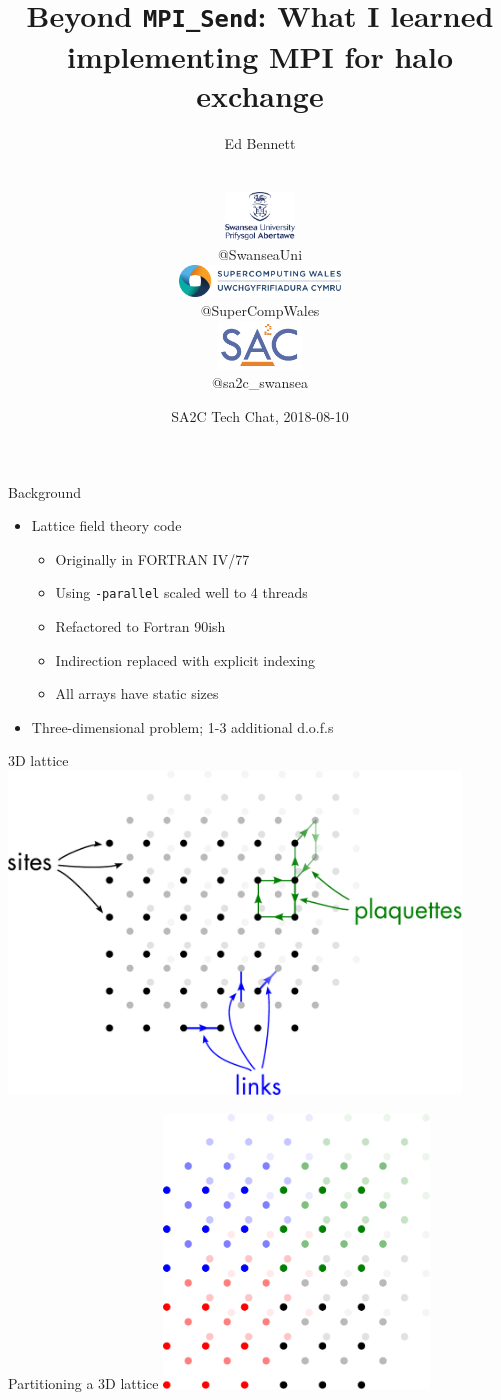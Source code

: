 \documentclass[handout]{beamer}
\title{Beyond \texttt{MPI\_Send}: What I learned implementing MPI for halo exchange}
\author{{\large Ed Bennett}
	\\{\small@QuantumofEd}
	\\\vspace{16pt}
	\hfill
	\parbox{0.22\textwidth}{\centering\includegraphics[height=36pt]{logos/swansea}\\\small @SwanseaUni}
	\parbox{0.44\textwidth}{\centering\includegraphics[height=24pt]{logos/scw}\\\small @SuperCompWales}
	\parbox{0.22\textwidth}{\centering\includegraphics[height=36pt]{logos/sa2c}\\\small @sa2c\_swansea} }
\date{SA2C Tech Chat, 2018-08-10}
\begin{document}
\frame{\titlepage}

\begin{frame}[fragile]{Background}
	\begin{itemize}[<+->]
		\item Lattice field theory code
		\begin{itemize}[<+->]
			\item Originally in FORTRAN IV/77
			\item Using \verb|-parallel| scaled well to 4 threads
			\item Refactored to Fortran 90ish
			\item Indirection replaced with explicit indexing
			\item All arrays have static sizes
		\end{itemize}
		\item Three-dimensional problem; 1-3 additional d.o.f.s
	\end{itemize}
\end{frame}

\begin{frame}{3D lattice}
	\center\includegraphics[width=0.9\textwidth]{figs/lattice-diagram}
\end{frame}

\begin{frame}{Partitioning a 3D lattice}
	\center\includegraphics[width=0.53\textwidth]{figs/lattice-diagram-partition}
\end{frame}
\end{document}
